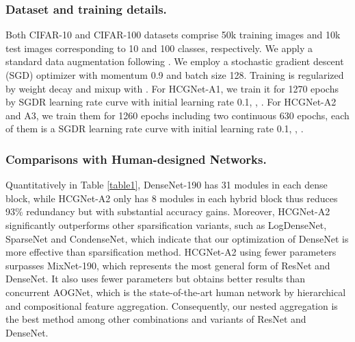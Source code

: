 \documentclass[letterpaper]{article}
\newcommand {\citet}[1]{\citeauthor{#1} \shortcite{#1}}
\begin{document}
 	\subsubsection{Dataset and training details.} Both CIFAR-10 and CIFAR-100 datasets comprise 50k training images and 10k test images corresponding to 10 and 100 classes, respectively. We apply a standard data augmentation following \citet{huang2017densely}. We employ a stochastic gradient descent (SGD) optimizer with momentum 0.9 and batch size 128. Training is regularized by weight decay  and mixup with  \cite{zhang2017mixup}. For HCGNet-A1, we train it for 1270 epochs by SGDR \cite{loshchilov2016sgdr} learning rate curve with initial learning rate 0.1, , . For HCGNet-A2 and A3, we train them for 1260 epochs including two continuous 630 epochs, each of them is a SGDR learning rate curve with initial learning rate 0.1, , .
 	

 \subsubsection{Comparisons with Human-designed Networks.} Quantitatively in Table \ref{table1}, DenseNet-190 has 31 modules in each dense block, while HCGNet-A2 only has 8 modules in each hybrid block thus reduces 93\% redundancy but with substantial accuracy gains. Moreover, HCGNet-A2 significantly outperforms other sparsification variants, such as LogDenseNet, SparseNet and CondenseNet, which indicate that our optimization of DenseNet is more effective than sparsification method. HCGNet-A2 using  fewer parameters surpasses MixNet-190, which represents the most general form of ResNet and DenseNet. It also uses  fewer parameters but obtains better results than concurrent AOGNet, which is the state-of-the-art human network by hierarchical and compositional feature aggregation. Consequently, our nested aggregation is the best method among other combinations and variants of ResNet and DenseNet. 
\end{document}
